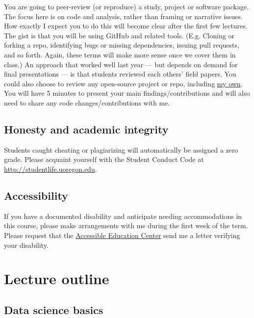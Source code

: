 \documentclass[12]{article}
\begin{document}
You are going to peer-review (or reproduce) a study, project or software package. The focus here is on code and analysis, rather than framing or narrative issues. How exactly I expect you to do this will become clear after the first few lectures. The gist is that you will be using GitHub and related tools. (E.g. Cloning or forking a repo, identifying bugs or missing dependencies, issuing pull requests, and so forth. Again, these terms will make more sense once we cover them in class.) An approach that worked well last year --- but depends on demand for final presentations --- is that students reviewed each others' field papers. You could also choose to review any open-source project or repo, including \href{https://github.com/grantmcdermott?tab=repositories}{my own}. You will have 5 minutes to present your main findings/contributions and will also need to share any code changes/contributions with me.

\subsection*{Honesty and academic integrity}

Students caught cheating or plagiarizing will automatically be assigned a zero grade. Please acquaint yourself with the Student Conduct Code at \href{http://studentlife.uoregon.edu}{http://studentlife.uoregon.edu}.

\subsection*{Accessibility}

If you have a documented disability and anticipate needing accommodations in this course, please make arrangements with me during the first week of the term. Please request that the \href{https://aec.uoregon.edu/}{Accessible Education Center} send me a letter verifying your disability.

\newpage
\section*{Lecture outline}
\label{sec:outline}


\subsection*{Data science basics}
\end{document}
